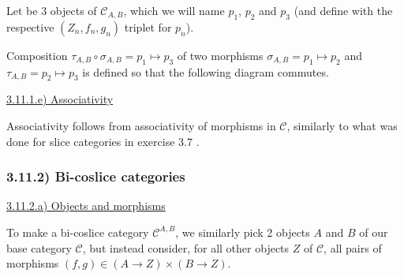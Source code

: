 \documentclass[12pt, letterpaper, twoside]{report}
\begin{document}
Let be 3 objects of $\mathcal{C}_{A,B}$, which we will name $p_1$, $p_2$ and $p_3$ (and define with the respective $(Z_n, f_n, g_n)$ triplet for $p_n$).

Composition $\tau_{A, B} \circ \sigma_{A, B} = p_1 \mapsto p_3$ of two morphisms $\sigma_{A, B} = p_1 \mapsto p_2$ and $\tau_{A, B} = p_2 \mapsto p_3$ is defined so that the following diagram commutes.



\vspace{5mm}
\underline{3.11.1.e) Associativity}

Associativity follows from associativity of morphisms in $\mathcal{C}$, similarly to what was done for slice categories in exercise 3.7 .



\subsubsection*{3.11.2) Bi-coslice categories}

\vspace{5mm}
\underline{3.11.2.a) Objects and morphisms}

To make a bi-coslice category $\mathcal{C}^{A,B}$, we similarly pick 2 objects $A$ and $B$ of our base category $\mathcal{C}$, but instead consider, for all other objects $Z$ of $\mathcal{C}$, all pairs of morphisms $(f, g) \in (A \to Z) \times (B \to Z)$.
\end{document}
